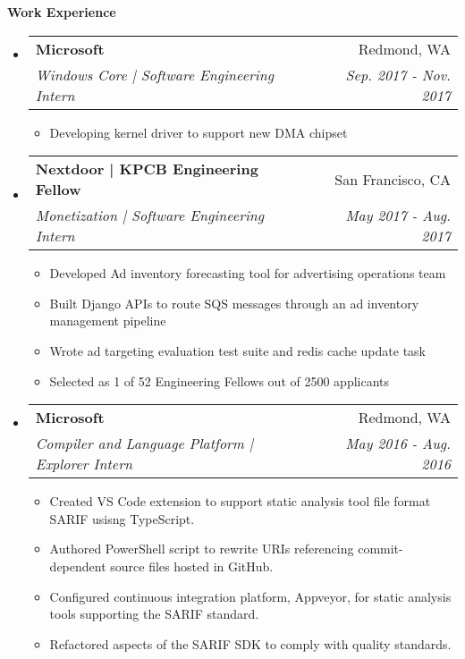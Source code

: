 \documentclass[letterpaper,10pt]{article}
\makeatletter
\newcommand{\resitem}[1]{\item #1 \vspace{-2pt}}
\newcommand{\resheading}[1]{{\large \colorbox{mygrey}{\begin{minipage}{\textwidth}{\textbf{#1 \vphantom{p\^{E}}}}\end{minipage}}}}
\newcommand{\ressubheading}[4]{
\begin{tabular*}{7.0in}{l@{\extracolsep{\fill}}r}
		\textbf{#1} & #2 \\
		\textit{#3} & \textit{#4} \\
\end{tabular*}\vspace{-6pt}}
\makeatother
\begin{document}
\resheading{Work Experience}
\begin{itemize}
\item
	\ressubheading{Microsoft}{Redmond, WA}{Windows Core | Software Engineering Intern}{Sep. 2017 - Nov. 2017}
	\begin{itemize}
		\resitem{Developing kernel driver to support new DMA chipset}
	\end{itemize}
\item
	\ressubheading{Nextdoor | KPCB Engineering Fellow}{San Francisco, CA}{Monetization | Software Engineering Intern}{May 2017 - Aug. 2017}
	\begin{itemize}
		\resitem{Developed Ad inventory forecasting tool for advertising operations team}
		\resitem{Built Django APIs to route SQS messages through an ad inventory management pipeline}
		\resitem{Wrote ad targeting evaluation test suite and redis cache update task}
		\resitem{Selected as 1 of 52 Engineering Fellows out of 2500 applicants}
	\end{itemize}
\item
	\ressubheading{Microsoft}{Redmond, WA}{Compiler and Language Platform | Explorer Intern}{May 2016 - Aug. 2016}
	\begin{itemize}
		\resitem{Created VS Code extension to support static analysis tool file format SARIF usisng TypeScript.}
	  \resitem{Authored PowerShell script to rewrite URIs referencing commit-dependent source files hosted in GitHub.}
		\resitem{Configured continuous integration platform, Appveyor, for static analysis tools supporting the SARIF standard.}
		\resitem{Refactored aspects of the SARIF SDK to comply with quality standards.}
	\end{itemize}
\end{itemize}
\end{document}
